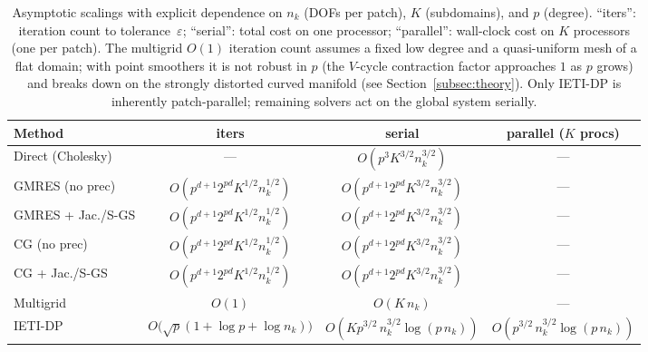 \documentclass{article}
\theoremstyle{plain}
\numberwithin{equation}{section}
\begin{document}
\begin{table}[h]
    \centering
    \caption{Asymptotic scalings with explicit dependence on $n_k$ (DOFs per patch),
        $K$ (subdomains), and $p$ (degree).
        ``iters'': iteration count to tolerance~$\varepsilon$;
        ``serial'': total cost on one processor; ``parallel'': wall-clock cost on $K$ processors
        (one per patch).
        The multigrid $O(1)$ iteration count assumes a fixed low degree and a
        quasi-uniform mesh of a flat domain; with point smoothers it is not robust in
        $p$ (the $V$-cycle contraction factor approaches $1$ as $p$ grows) and breaks
        down on the strongly distorted curved manifold (see Section~\ref{subsec:theory}).
        Only IETI-DP is inherently patch-parallel; remaining solvers act on the global system serially.}
    \label{tab:theory}
    \small
    \begin{tabular}{lccc}
        \toprule
        Method            & iters                                        & serial                                  & parallel ($K$ procs)                  \\
        \midrule
        Direct (Cholesky) & ---                                          & $O(p^3 K^{3/2}n_k^{3/2})$               & ---                                   \\
        GMRES (no prec)   & $O(p^{d+1} 2^{pd} K^{1/2} n_k^{1/2})$        & $O(p^{d+1} 2^{pd} K^{3/2} n_k^{3/2})$   & ---                                   \\
        GMRES + Jac./S-GS & $O(p^{d+1} 2^{pd} K^{1/2} n_k^{1/2})$        & $O(p^{d+1} 2^{pd} K^{3/2} n_k^{3/2})$   & ---                                   \\
        CG (no prec)      & $O(p^{d+1} 2^{pd} K^{1/2} n_k^{1/2})$        & $O(p^{d+1} 2^{pd} K^{3/2} n_k^{3/2})$   & ---                                   \\
        CG + Jac./S-GS    & $O(p^{d+1} 2^{pd} K^{1/2} n_k^{1/2})$        & $O(p^{d+1} 2^{pd} K^{3/2} n_k^{3/2})$   & ---                                   \\
        Multigrid         & $O(1)$                                       & $O(K\,n_k)$                             & ---                                   \\
        IETI-DP           & $O\!\bigl(\sqrt{p}(1+\log p+\log n_k)\bigr)$ & $O(K p^{3/2}\,n_k^{3/2}\!\log(p\,n_k))$ & $O(p^{3/2}\,n_k^{3/2}\!\log(p\,n_k))$ \\
        \bottomrule
    \end{tabular}
\end{table}
\end{document}

